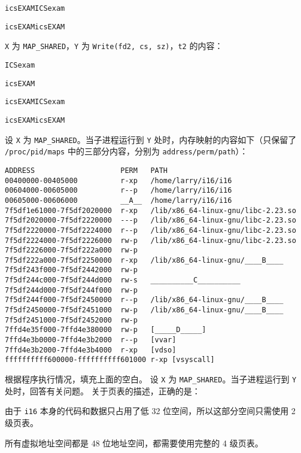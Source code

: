 \begin{problems}
\begin{choices}
                \item \verb|icsEXAMICSexam|
                \item \verb|icsEXAMicsEXAM|
            \end{choices}
            \subqn \verb|X| 为 \verb|MAP_SHARED|，\verb|Y| 为 \verb|Write(fd2, cs, sz)|，\verb|t2| 的内容：
            \begin{choices}
                \item \verb|ICSexam|
                \item \verb|icsEXAM|
                \item \verb|icsEXAMICSexam|
                \item \verb|icsEXAMicsEXAM|
            \end{choices}
        \qn 设 \verb|X| 为 \verb|MAP_SHARED|。当子进程运行到 \verb|Y| 处时，内存映射的内容如下（只保留了 \verb|/proc/pid/maps| 中的三部分内容，分别为 \verb|address/perm/path|）：
        \begin{verbatim}
ADDRESS                    PERM   PATH 
00400000-00405000          r-xp   /home/larry/i16/i16
00604000-00605000          r--p   /home/larry/i16/i16
00605000-00606000          __A__  /home/larry/i16/i16
7f5df1e61000-7f5df2020000  r-xp   /lib/x86_64-linux-gnu/libc-2.23.so
7f5df2020000-7f5df2220000  ---p   /lib/x86_64-linux-gnu/libc-2.23.so
7f5df2220000-7f5df2224000  r--p   /lib/x86_64-linux-gnu/libc-2.23.so
7f5df2224000-7f5df2226000  rw-p   /lib/x86_64-linux-gnu/libc-2.23.so
7f5df2226000-7f5df222a000  rw-p
7f5df222a000-7f5df2250000  r-xp   /lib/x86_64-linux-gnu/____B____
7f5df243f000-7f5df2442000  rw-p
7f5df244c000-7f5df244d000  rw-s   __________C__________
7f5df244d000-7f5df244f000  rw-p
7f5df244f000-7f5df2450000  r--p   /lib/x86_64-linux-gnu/____B____
7f5df2450000-7f5df2451000  rw-p   /lib/x86_64-linux-gnu/____B____
7f5df2451000-7f5df2452000  rw-p
7ffd4e35f000-7ffd4e380000  rw-p   [_____D_____]
7ffd4e3b0000-7ffd4e3b2000  r--p   [vvar]
7ffd4e3b2000-7ffd4e3b4000  r-xp   [vdso]
ffffffffff600000-ffffffffff601000 r-xp [vsyscall]
        \end{verbatim}
        根据程序执行情况，填充上面的空白。
        \qn 设 \verb|X| 为 \verb|MAP_SHARED|。当子进程运行到 \verb|Y| 处时，回答有关问题。
            \subqn 关于页表的描述，正确的是：
            \begin{choices}
                \item 由于 \verb|i16| 本身的代码和数据只占用了低 32 位空间，所以这部分空间只需使用 2 级页表。
                \item 所有虚拟地址空间都是 48 位地址空间，都需要使用完整的 4 级页表。

\end{choices}
\end{problems}
